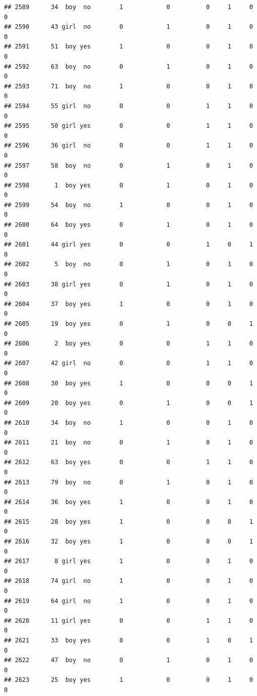 \documentclass[man]{apa6}
\begin{document}
\begin{verbatim}
## 2589      34  boy  no        1            0          0     1     0     0
## 2590      43 girl  no        0            1          0     1     0     0
## 2591      51  boy yes        1            0          0     1     0     0
## 2592      63  boy  no        0            1          0     1     0     0
## 2593      71  boy  no        1            0          0     1     0     0
## 2594      55 girl  no        0            0          1     1     0     0
## 2595      50 girl yes        0            0          1     1     0     0
## 2596      36 girl  no        0            0          1     1     0     0
## 2597      58  boy  no        0            1          0     1     0     0
## 2598       1  boy yes        0            1          0     1     0     0
## 2599      54  boy  no        1            0          0     1     0     0
## 2600      64  boy yes        0            1          0     1     0     0
## 2601      44 girl yes        0            0          1     0     1     0
## 2602       5  boy  no        0            1          0     1     0     0
## 2603      38 girl yes        0            1          0     1     0     0
## 2604      37  boy yes        1            0          0     1     0     0
## 2605      19  boy yes        0            1          0     0     1     0
## 2606       2  boy yes        0            0          1     1     0     0
## 2607      42 girl  no        0            0          1     1     0     0
## 2608      30  boy yes        1            0          0     0     1     0
## 2609      20  boy yes        0            1          0     0     1     0
## 2610      34  boy  no        1            0          0     1     0     0
## 2611      21  boy  no        0            1          0     1     0     0
## 2612      63  boy yes        0            0          1     1     0     0
## 2613      79  boy  no        0            1          0     1     0     0
## 2614      36  boy yes        1            0          0     1     0     0
## 2615      28  boy yes        1            0          0     0     1     0
## 2616      32  boy yes        1            0          0     0     1     0
## 2617       8 girl yes        1            0          0     1     0     0
## 2618      74 girl  no        1            0          0     1     0     0
## 2619      64 girl  no        1            0          0     1     0     0
## 2620      11 girl yes        0            0          1     1     0     0
## 2621      33  boy yes        0            0          1     0     1     0
## 2622      47  boy  no        0            1          0     1     0     0
## 2623      25  boy yes        1            0          0     1     0     0

\end{verbatim}
\end{document}
